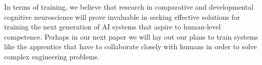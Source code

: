 \documentclass[letterpaper,11pt]{article}
\begin{document}
In terms of training, we believe that research in comparative and developmental cognitive neuroscience will prove invaluable in seeking effective solutions for training the next generation of AI systems that aspire to human-level competence. Perhaps in our next paper we will lay out our plans to train systems like the apprentice that have to collaborate closely with humans in order to solve complex engineering problems. 







\end{document}
